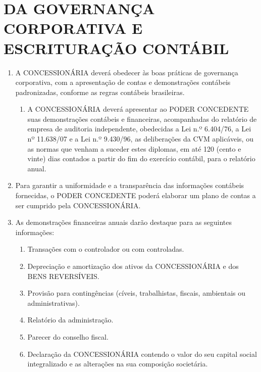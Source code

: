 \documentclass[a4paper,11pt]{report} %
\begin{document}
\section{DA GOVERNANÇA CORPORATIVA E ESCRITURAÇÃO CONTÁBIL}
\label{sec:UY7Z}

\begin{enumerate}
\item \label{itm:5GU4}	A CONCESSIONÁRIA deverá obedecer às boas práticas de governança corporativa, com a apresentação de contas e demonstrações contábeis padronizadas, conforme as regras contábeis brasileiras.

\begin{enumerate}[label*=\arabic*.]
\item \label{itm:SPKW}	A CONCESSIONÁRIA deverá apresentar ao PODER CONCEDENTE suas demonstrações contábeis e financeiras, acompanhadas do relatório de empresa de auditoria independente, obedecidas a Lei n.º 6.404/76, a Lei nº 11.638/07 e a Lei n.º 9.430/96, as deliberações da CVM aplicáveis, ou as normas que venham a suceder estes diplomas, em até 120 (cento e vinte) dias contados a partir do fim do exercício contábil, para o relatório anual.
\end{enumerate}

\item \label{itm:369A}	Para garantir a uniformidade e a transparência das informações contábeis fornecidas, o PODER CONCEDENTE poderá elaborar um plano de contas a ser cumprido pela CONCESSIONÁRIA.

\item \label{itm:JJML}	As demonstrações financeiras anuais darão destaque para as seguintes informações:

\begin{enumerate}[label*=\arabic*.]
\item \label{itm:4H3U} Transações com o controlador ou com controladas.

\item \label{itm:EP8R} Depreciação e amortização dos ativos da CONCESSIONÁRIA e dos BENS REVERSÍVEIS.

\item \label{itm:YMWB} Provisão para contingências (cíveis, trabalhistas, fiscais, ambientais ou administrativas).

\item \label{itm:PDJQ} Relatório da administração.

\item \label{itm:8E9H} Parecer do conselho fiscal.

\item \label{itm:SD6K} Declaração da CONCESSIONÁRIA contendo o valor do seu capital social integralizado e as alterações na sua composição societária.
\end{enumerate}
\end{enumerate}
\end{document}
